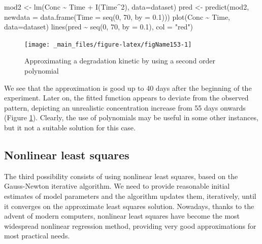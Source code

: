 \documentclass[a4paper,12pt,oneside]{book}
\newenvironment{Shaded}{\begin{snugshade}}{\end{snugshade}}
\newcommand{\DecValTok}[1]{#1}
\newcommand{\FloatTok}[1]{#1}
\newcommand{\SpecialCharTok}[1]{#1}
\newcommand{\StringTok}[1]{#1}
\newcommand{\OtherTok}[1]{#1}
\newcommand{\FunctionTok}[1]{#1}
\newcommand{\AttributeTok}[1]{#1}
\newcommand{\NormalTok}[1]{#1}
\begin{document}
\begin{Shaded}
\begin{Highlighting}[]
\NormalTok{mod2 }\OtherTok{\textless{}{-}} \FunctionTok{lm}\NormalTok{(Conc }\SpecialCharTok{\textasciitilde{}}\NormalTok{ Time }\SpecialCharTok{+} \FunctionTok{I}\NormalTok{(Time}\SpecialCharTok{\^{}}\DecValTok{2}\NormalTok{), }\AttributeTok{data=}\NormalTok{dataset)}
\NormalTok{pred }\OtherTok{\textless{}{-}} \FunctionTok{predict}\NormalTok{(mod2, }\AttributeTok{newdata =} \FunctionTok{data.frame}\NormalTok{(}\AttributeTok{Time =} \FunctionTok{seq}\NormalTok{(}\DecValTok{0}\NormalTok{, }\DecValTok{70}\NormalTok{, }\AttributeTok{by =} \FloatTok{0.1}\NormalTok{)))}
\FunctionTok{plot}\NormalTok{(Conc }\SpecialCharTok{\textasciitilde{}}\NormalTok{ Time, }\AttributeTok{data=}\NormalTok{dataset)}
\FunctionTok{lines}\NormalTok{(pred }\SpecialCharTok{\textasciitilde{}} \FunctionTok{seq}\NormalTok{(}\DecValTok{0}\NormalTok{, }\DecValTok{70}\NormalTok{, }\AttributeTok{by =} \FloatTok{0.1}\NormalTok{), }\AttributeTok{col =} \StringTok{"red"}\NormalTok{)}
\end{Highlighting}
\end{Shaded}

\begin{figure}

{\centering \texttt{[image: \_main\_files/figure-latex/figName153-1]} 

}

\caption{Approximating a degradation kinetic by using a second order polynomial}\label{fig:figName153}
\end{figure}

We see that the approximation is good up to 40 days after the beginning of the experiment. Later on, the fitted function appears to deviate from the observed pattern, depicting an unrealistic concentration increase from 55 days onwards (Figure \ref{fig:figName153}). Clearly, the use of polynomials may be useful in some other instances, but it not a suitable solution for this case.

\hypertarget{nonlinear-least-squares}{%
\subsection{Nonlinear least squares}\label{nonlinear-least-squares}}

The third possibility consists of using nonlinear least squares, based on the Gauss-Newton iterative algorithm. We need to provide reasonable initial estimates of model parameters and the algorithm updates them, iteratively, until it converges on the approximate least squares solution. Nowadays, thanks to the advent of modern computers, nonlinear least squares have become the most widespread nonlinear regression method, providing very good approximations for most practical needs.
\end{document}
